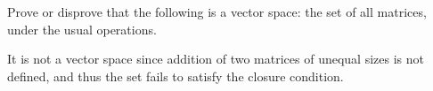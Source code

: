
\begin{Exercise}[
name={},
title={}, 
difficulty=0,
origin={\cite{JH}}]

Prove or disprove that
the following is a vector space: the set of all matrices, under
the usual operations.
\end{Exercise}

\begin{Answer}

It is not a vector space since addition of two matrices of unequal
sizes is not defined, and thus the set fails to satisfy the closure
condition.


\end{Answer}
